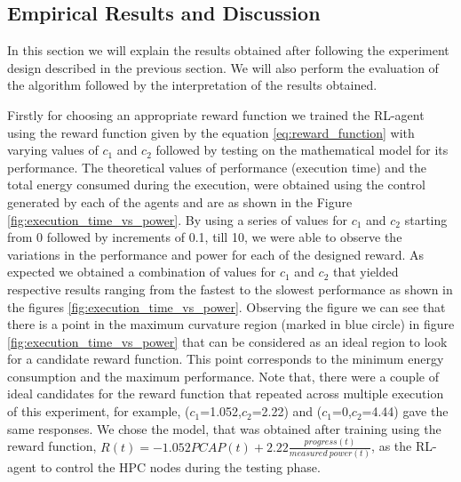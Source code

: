 \subsection{Empirical Results and Discussion} 
\label{Sec:Results}
In this section we will explain the results obtained after following the experiment design described in the previous section. We will also perform the evaluation of the algorithm followed by the interpretation of the results obtained.
  
Firstly for choosing an appropriate reward function we trained the RL-agent using the reward function given by the equation \eqref{eq:reward_function} with varying values of $c_1$ and $c_2$ followed by testing on the mathematical model for its performance.
 The theoretical values of performance (execution time) and the total energy consumed during the execution, were obtained using the control generated by each of the agents and are as shown in the Figure \ref{fig:execution_time_vs_power}.
 By using a series of values for $c_1$ and $c_2$ starting from 0 followed by increments of 0.1, till 10, we were able to observe the variations in the performance and power for each of the designed reward. As expected we obtained a combination of values for $c_1$ and $c_2$ that yielded respective results ranging from the fastest to the slowest performance as shown in the figures \ref{fig:execution_time_vs_power}.
Observing the figure we can see that there is a point in the maximum curvature region (marked in blue circle) in figure \ref{fig:execution_time_vs_power} that can be considered as an ideal region to look for a candidate reward function. This point corresponds to the minimum energy consumption and the maximum performance. Note that, there were a couple of ideal candidates for the reward function that repeated across multiple execution of this experiment, for example, ($c_1$=1.052,$c_2$=2.22) and ($c_1$=0,$c_2$=4.44) gave the same responses. We chose the model, that was obtained after training using the reward function, $R(t) = -1.052 PCAP(t) + 2.22 \frac{progress(t)}{measured \ power(t)}$, as the RL-agent to control the HPC nodes during the testing phase.

